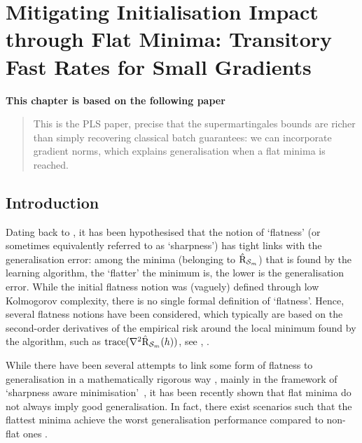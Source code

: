 \chapter[Mitigating Initialisation Impact through Flat Minima: Transitory Fast Rates for Small Gradients]{Mitigating Initialisation Impact through Flat Minima: Transitory Fast Rates for Small Gradients}
\label{chap:gen-flat-minima}
\addchapterlof
\addchapterloa
\addchapterloe
 
\vspace{-2.0cm}
\begin{center}
\textbf{This chapter is based on the following paper}\\[-0.1cm]
\end{center}


\vspace{0.2cm}
\minitoc

\begin{abstract}
\vspace{-0.2cm}
This is the PLS paper, precise that the supermartingales bounds are richer than simply recovering classical batch guarantees: we can incorporate gradient norms, which explains generalisation when a flat minima is reached.
\end{abstract}

\newpage

\section{Introduction}


Dating back to \citet{hochreiter1997flat}, it has been hypothesised that the notion of `flatness' (or sometimes equivalently referred to as `sharpness') has tight links with the generalisation error: among the minima (belonging to $\hat{\text{R}}_{\mathcal{S}_m}$) that is found by the learning algorithm, the `flatter' the minimum is, the lower is the generalisation error.
While the initial flatness notion was (vaguely) defined through low Kolmogorov complexity, there is no single formal definition of `flatness'.
Hence, several flatness notions have been considered, which typically are based on the second-order derivatives of the empirical risk around the local minimum found by the algorithm, such as $\mathrm{trace}(\nabla^2 \hat{\text{R}}_{\mathcal{S}_m}(h))$, see \eg, \citet{jastrzkebski2017three, wen2023sharpness}.


While there have been several attempts to link some form of flatness to generalisation in a mathematically rigorous way \citep{neyshabur2017explor,petzka2021relative,yue2023sharpness, andriushchenko2023modern}, mainly in the framework of `sharpness aware minimisation'~\citep{foret2020sharpness}, it has been recently shown that flat minima do not always imply good generalisation.
In fact, there exist scenarios such that the flattest minima achieve the worst generalisation performance compared to non-flat ones \citep{wen2023sharpness}. 


